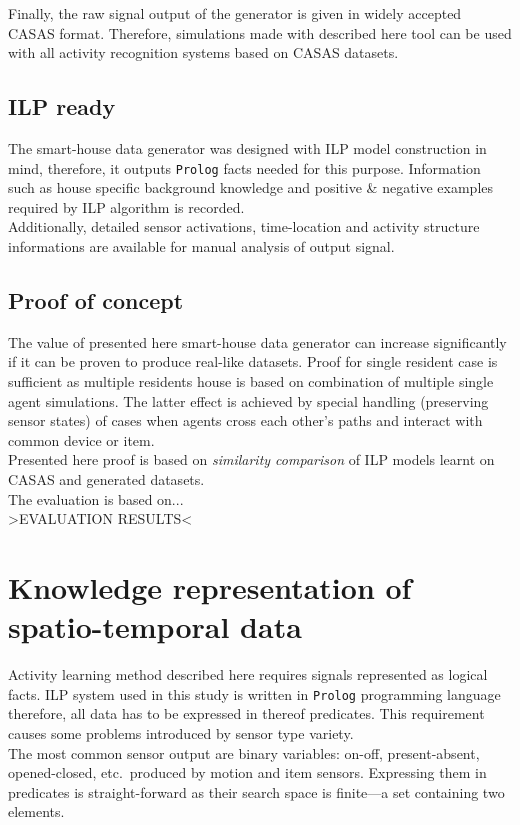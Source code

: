 \documentclass[12pt, a4paper, pdflatex, leqno, twoside, openright]{report}
\begin{document}
Finally, the raw signal output of the generator is given in widely accepted CASAS format. Therefore, simulations made with described here tool can be used with all activity recognition systems based on CASAS datasets.

    \subsection{ILP ready}
The smart-house data generator was designed with ILP model construction in mind, therefore, it outputs \texttt{Prolog} facts needed for this purpose. Information such as house specific background knowledge and positive \& negative examples required by ILP algorithm is recorded.\\
Additionally, detailed sensor activations, time-location and activity structure informations are available for manual analysis of output signal.

    \subsection{Proof of concept}
The value of presented here smart-house data generator can increase significantly if it can be proven to produce real-like datasets. Proof for single resident case is sufficient as multiple residents house is based on combination of multiple single agent simulations. The latter effect is achieved by special handling (preserving sensor states) of cases when agents cross each other's paths and interact with common device or item.\\
Presented here proof is based on \emph{similarity comparison} of ILP models learnt on CASAS and generated datasets.\\

The evaluation is based on...\\
>EVALUATION RESULTS<

  \section{Knowledge representation of spatio-temporal data}
Activity learning method described here requires signals represented as logical facts. ILP system used in this study is written in \texttt{Prolog} programming language therefore, all data has to be expressed in thereof predicates. This requirement causes some problems introduced by sensor type variety.\\

The most common sensor output are binary variables: on-off, present-absent, opened-closed, etc.\ produced by motion and item sensors. Expressing them in predicates is straight-forward as their search space is finite---a set containing two elements.
\end{document}
